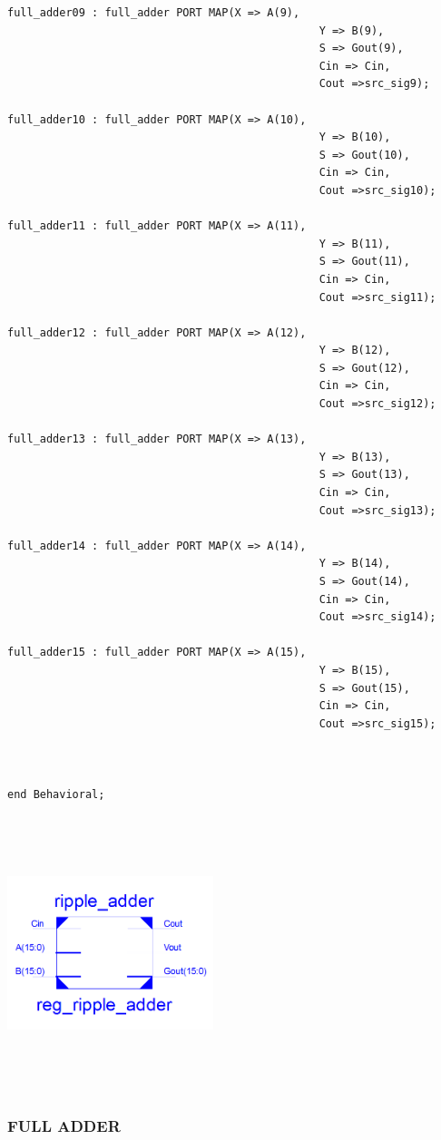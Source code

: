 \documentclass{article}
\begin{document}
\begin{lstlisting}
full_adder09 : full_adder PORT MAP(X => A(9),
												Y => B(9),
												S => Gout(9),
												Cin => Cin,
												Cout =>src_sig9);
												
full_adder10 : full_adder PORT MAP(X => A(10),
												Y => B(10),
												S => Gout(10),
												Cin => Cin,
												Cout =>src_sig10);

full_adder11 : full_adder PORT MAP(X => A(11),
												Y => B(11),
												S => Gout(11),
												Cin => Cin,
												Cout =>src_sig11);

full_adder12 : full_adder PORT MAP(X => A(12),
												Y => B(12),
												S => Gout(12),
												Cin => Cin,
												Cout =>src_sig12);

full_adder13 : full_adder PORT MAP(X => A(13),
												Y => B(13),
												S => Gout(13),
												Cin => Cin,
												Cout =>src_sig13);
												
full_adder14 : full_adder PORT MAP(X => A(14),
												Y => B(14),
												S => Gout(14),
												Cin => Cin,
												Cout =>src_sig14);

full_adder15 : full_adder PORT MAP(X => A(15),
												Y => B(15),
												S => Gout(15),
												Cin => Cin,
												Cout =>src_sig15);



end Behavioral;
\end{lstlisting}

\includegraphics[width=6cm, height=8cm]{ripple.png}
\pagebreak



\subsubsection{FULL ADDER}\label{sec:result}
\end{document}
